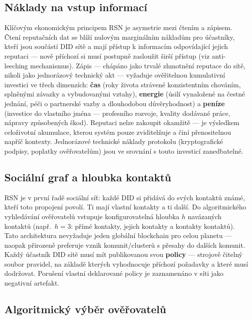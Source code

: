 \documentclass[11pt,a4paper,twocolumn]{article}
\begin{document}
\subsection{Náklady na vstup informací}

Klíčovým ekonomickým principem RSN je asymetrie mezi čtením a zápisem. Čtení reputačních dat se blíží nulovým marginálním nákladům pro účastníky, kteří jsou součástí DID sítě a mají přístup k informacím odpovídající jejich reputaci --- nově příchozí si musí postupně zasloužit širší přístup (viz anti-leeching mechanismus). Zápis --- chápáno jako trvalé zhmotnění reputace do sítě, nikoli jako jednorázový technický akt --- vyžaduje ověřitelnou kumulativní investici ve třech dimenzích: \textbf{čas} (roky života strávené konzistentním chováním, splněnými závazky a vybudovanými vztahy), \textbf{energie} (úsilí vynaložené na čestné jednání, péči o partnerské vazby a dlouhodobou důvěryhodnost) a \textbf{peníze} (investice do vlastního jména --- profesního rozvoje, kvality dodávané práce, nápravy způsobených škod). Reputaci nelze zakoupit okamžitě --- je výsledkem celoživotní akumulace, kterou systém pouze zviditelňuje a činí přenositelnou napříč kontexty. Jednorázové technické náklady protokolu (kryptografické podpisy, poplatky ověřovatelům) jsou ve srovnání s touto investicí zanedbatelné.

\subsection{Sociální graf a hloubka kontaktů}

RSN je v první řadě sociální síť: každé DID si přidává do svých kontaktů známé, kteří toto propojení povolí. Ti mají vlastní kontakty a ti další. Do algoritmického vyhledávání ověřovatelů vstupuje konfigurovatelná hloubka $h$ navázaných kontaktů (např.\ $h=3$: přímé kontakty, jejich kontakty a kontakty kontaktů). Tato architektura nevyžaduje jeden globální blockchain pro celou planetu --- naopak přirozeně preferuje vznik komunit/clusterů s přesahy do dalších komunit. Každý účastník DID sítě musí mít publikovanou svou \textbf{policy} --- strojově čitelný soubor pravidel, na základě kterých vyhodnocuje příchozí požadavky a které musí dodržovat. Porušení vlastní deklarované policy je zaznamenáno v síti jako negativní artefakt.

\subsection{Algoritmický výběr ověřovatelů}
\end{document}
